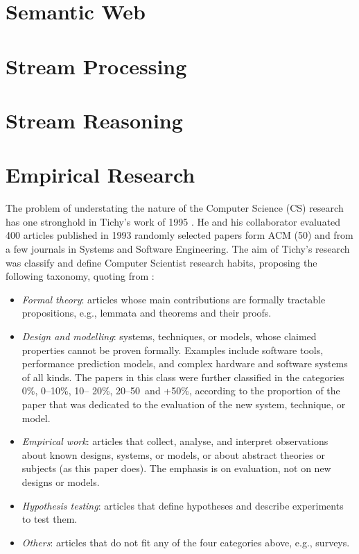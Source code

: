\section{Semantic Web}
\section{Stream Processing}
\section{Stream Reasoning}
\section{Empirical Research}\label{sec:empirical-research}

The problem of understating the nature of the Computer Science (CS) research has one stronghold in Tichy's work of 1995 \cite{Tichy:1995:EEC:209090.209093}. He and his collaborator evaluated 400 articles published in 1993 randomly selected papers form ACM (50) and from a few journals in Systems and Software Engineering. The aim of Tichy's research was classify and define Computer Scientist research habits, proposing the following taxonomy, quoting from \cite{Tichy:1995:EEC:209090.209093}:
\begin{itemize}
\item \textit{Formal theory}: articles whose main contributions are formally tractable propositions, e.g., lemmata and theorems and their proofs.
\item \textit{Design and modelling}: systems, techniques, or models, whose claimed properties cannot be proven formally. Examples include software tools, performance prediction models, and complex hardware and software systems of all kinds. The papers in this class were further classified in the categories 0\%, 0–10\%, 10– 20\%, 20–50\, and +50\%, according to the proportion of the paper that was dedicated to the evaluation of the new system, technique, or model.
\item \textit{Empirical work}: articles that collect, analyse, and interpret observations about known designs, systems, or models, or about abstract theories or subjects (as this paper does). The emphasis is on evaluation, not on new designs or models.
\item \textit{Hypothesis testing}: articles that define hypotheses and describe experiments to test them.
\item \textit{Others}: articles that do not fit any of the four categories above, e.g., surveys.
\end{itemize}

